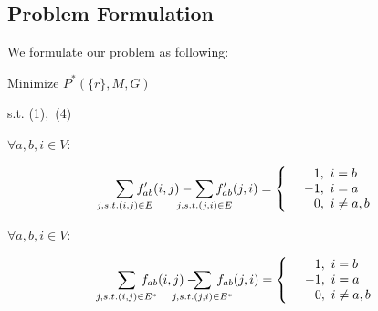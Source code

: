 \documentclass[conference]{IEEEtran}
\begin{document}
\subsection{Problem Formulation}
We formulate our problem as following:

\begin{center}
Minimize \quad $P^*(\{r\},M,G)$
\end{center}

\begin{center}
s.t. (1),\ (4)
\end{center}


\begin{center}
    $\forall a,b,i \in V$: \quad \quad \quad \quad \quad \quad \quad \quad \quad \quad \quad \quad \quad \quad \quad 
    \vspace{-0.3in}
\end{center}

\begin{equation}
    \begin{split}
    \sum_{j, s.t.(i,j) \in E}\hspace{-0.2in}f'_{ab}(i,j) - \hspace{-0.2in}\sum_{j, s.t.(j,i) \in E}\hspace{-0.2in}f'_{ab}(j,i) = 
    \left\{
        \begin{array}{c}
        \ \ 1, \ i = b \\
        -1, \ i = a \\
        \ \ \ \ \ 0, \ i \neq a,b \\
        \end{array}
    \right.
    \end{split}
\end{equation}

\begin{center}
    \vspace{0.1in}
    $\forall a,b,i \in V$: \quad \quad \quad \quad \quad \quad \quad \quad \quad \quad \quad \quad \quad \quad \quad
    \vspace{-0.3in}
\end{center}

\begin{equation}
    \begin{split}
    \sum_{j, s.t.(i,j) \in E^*}\hspace{-0.2in}f_{ab}(i,j) - \hspace{-0.3in}\sum_{j, s.t.(j,i) \in E^*}\hspace{-0.2in}f_{ab}(j,i) = 
    \left\{
        \begin{array}{c}
        \ \ 1, \ i = b \\
        -1, \ i = a \\
        \ \ \ \ \ 0, \ i \neq a,b \\
        \end{array}
    \right.
    \end{split}
\end{equation}
\end{document}
